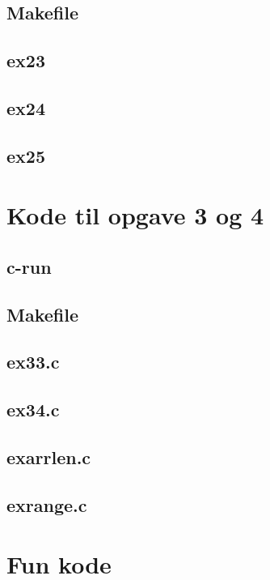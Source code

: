 \documentclass[danish,a4paper]{report}
\begin{document}
\section*{Makefile}

\section*{ex23}

\section*{ex24}

\section*{ex25}


\chapter{Kode til opgave 3 og 4}
\section*{c-run}

\section*{Makefile}

\section*{ex33.c}

\section*{ex34.c}

\section*{exarrlen.c}

\section*{exrange.c}


\chapter{Fun kode}
\end{document}
